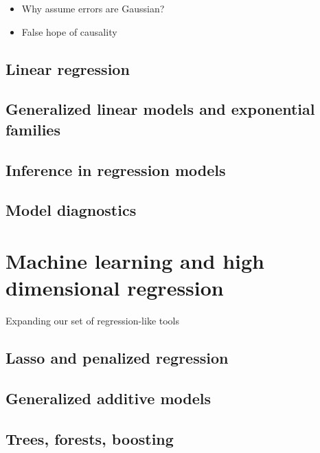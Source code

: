 \documentclass[]{book}
\providecommand{\tightlist}{%
  \setlength{\itemsep}{0pt}\setlength{\parskip}{0pt}}
\theoremstyle{definition}
\theoremstyle{definition}
\theoremstyle{definition}
\theoremstyle{remark}
\begin{document}
\begin{itemize}
\tightlist
\item
  Why assume errors are Gaussian?
\item
  False hope of causality
\end{itemize}

\section{Linear regression}\label{linear-regression}

\section{Generalized linear models and exponential
families}\label{generalized-linear-models-and-exponential-families}

\section{Inference in regression
models}\label{inference-in-regression-models}

\section{Model diagnostics}\label{model-diagnostics}

\chapter{Machine learning and high dimensional
regression}\label{machine-learning-and-high-dimensional-regression}

Expanding our set of regression-like tools

\section{Lasso and penalized
regression}\label{lasso-and-penalized-regression}

\section{Generalized additive models}\label{generalized-additive-models}

\section{Trees, forests, boosting}\label{trees-forests-boosting}
\end{document}
